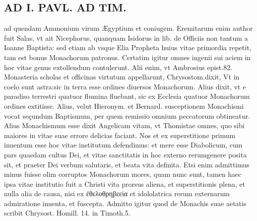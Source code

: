 \documentclass{article}
\begin{document}
\begin{pages}
\section*{AD I. PAVL. AD TIM. }
\marginpar{[ p.216 ]}\pstart ad quendam Ammonium virum Ægyptium et coniugem. Eremitarum enim author fuit Salas, vt ait Nicephorus, quanquam Isidorus in lib.  de Officiis non tantum a Ioanne Baptista: sed etiam ab vsque Elia Propheta huius vitae primordia repetit, tam est bonus Monachorum patronus. Certatim igitur omnes ingenii sui aciem in hoc vitae genus extollendum contulerunt. Alii enim, vt Ambrosius epist.82. Monasteria scholas et officinas virtutum appellarunt, Chrysostom.dixit, Vt in coelo sunt astra:sic in terra esse ordines diuersos Monachorum. Alius dixit, vt e paradiso terrestri quatuor flumina fluebant, sic ex Ecclesia quatuor Monachorum ordines extitisse. Alius, velut Hieronym. et Bernard. susceptionem Monachismi vocat seçundum Baptismum, per quem remissio omnium peccatorum obtineatur. Alius Monachismum esse dixit Angelicam vitam, vt Thomistae omnes, quo sibi maiores in vitae suae errore delicias faciant. Nos et ex superstitione primum inuentum esse hoc vitae institutum defendimus: et mere esse Diabolicum, cum pars quaedam cultus Dei, et vitae sanctitatis in hoc externo rerumgenere posita sit, et praeter Dei verbum salutaris, et beata vita definita. Etsi enim admittimus minus fuisse olim corruptos Monachorum mores, quam nunc sunt, tamen haec ipsa vitae institutio fuit a Christi vita prorsus aliena, et superstitionis plena, et nulla alia de causa, nisi ex ἐθελοθρηβεεία et idololatrica rerum externarum admiratione inuenta, et fuscepta. Admitto igitur quod de Monachis suae aetatis scribit Chrysost. Homill. 14. in Timoth.5.  \pend

\end{pages}
\end{document}
